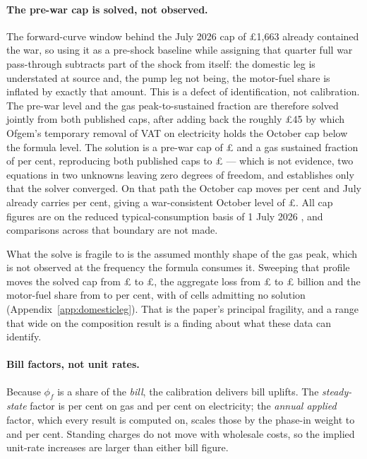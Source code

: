 \paragraph{The pre-war cap is solved, not observed.} The forward-curve window behind the July 2026 cap of \pounds 1{,}663 already contained the war, so using it as a pre-shock baseline while assigning that quarter full war pass-through subtracts part of the shock from itself: the domestic leg is understated at source and, the pump leg not being, the motor-fuel share is inflated by exactly that amount. This is a defect of identification, not calibration. The pre-war level and the gas peak-to-sustained fraction are therefore solved jointly from both published caps, after adding back the roughly \pounds 45 by which Ofgem's temporary removal of VAT on electricity holds the October cap below the formula level. The solution is a pre-war cap of \pounds \genCapBaselineLevel{} and a gas sustained fraction of \genGasSustainedFraction{} per cent, reproducing both published caps to \pounds \genCapFitMaxErrorGbp{} --- which is not evidence, two equations in two unknowns leaving zero degrees of freedom, and establishes only that the solver converged. On that path the October cap moves \genCapAnchorMovePct{} per cent and July already carries \genCapBaseMovePct{} per cent, giving a war-consistent October level of \pounds \genCapAnnualised{}. All cap figures are on the reduced typical-consumption basis of 1 July 2026 \citep{ofgem2026tdcv}, and comparisons across that boundary are not made.

What the solve is fragile to is the assumed monthly shape of the gas peak, which is not observed at the frequency the formula consumes it. Sweeping that profile moves the solved cap from \pounds \genGasProfileCapMinGbp{} to \pounds \genGasProfileCapMaxGbp{}, the aggregate loss from \pounds \genGasProfileAggMinBn{} to \pounds \genGasProfileAggMaxBn{} billion and the motor-fuel share from \genGasProfileFuelShareMinPct{} to \genGasProfileFuelShareMaxPct{} per cent, with \genGasProfileNonIdentifiedCount{} of \genGasProfileCellCount{} cells admitting no solution (Appendix~\ref{app:domesticleg}). That is the paper's principal fragility, and a range that wide on the composition result is a finding about what these data can identify.

\paragraph{Bill factors, not unit rates.} Because $\phi_f$ is a share of the \emph{bill}, the calibration delivers bill uplifts. The \emph{steady-state} factor is \genGasUnitRatePct{} per cent on gas and \genElecUnitRatePct{} per cent on electricity; the \emph{annual applied} factor, which every result is computed on, scales those by the phase-in weight to \genAnnualPhaseInGasPct{} and \genAnnualPhaseInElecPct{} per cent. Standing charges do not move with wholesale costs, so the implied unit-rate increases are larger than either bill figure.

